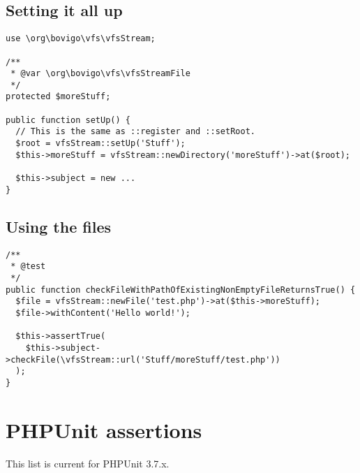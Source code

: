 \documentclass[a4paper,twoside,landscape]{scrartcl}
\begin{document}
\subsection{Setting it all up}
\begin{verbatim}
use \org\bovigo\vfs\vfsStream;

/**
 * @var \org\bovigo\vfs\vfsStreamFile
 */
protected $moreStuff;

public function setUp() {
  // This is the same as ::register and ::setRoot.
  $root = vfsStream::setUp('Stuff');
  $this->moreStuff = vfsStream::newDirectory('moreStuff')->at($root);

  $this->subject = new ...
}
\end{verbatim}

\subsection{Using the files}
\begin{verbatim}
/**
 * @test
 */
public function checkFileWithPathOfExistingNonEmptyFileReturnsTrue() {
  $file = vfsStream::newFile('test.php')->at($this->moreStuff);
  $file->withContent('Hello world!');

  $this->assertTrue(
    $this->subject->checkFile(\vfsStream::url('Stuff/moreStuff/test.php'))
  );
}
\end{verbatim}


\section{PHPUnit assertions}
This list is current for PHPUnit 3.7.x.
\end{document}
